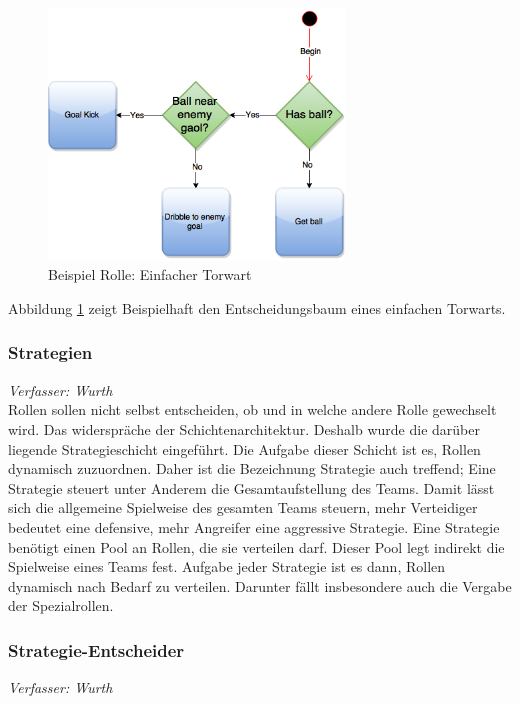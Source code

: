 \documentclass[fontsize=12pt,a4paper,final]{scrartcl}[2003/01/01]
\begin{document}
\begin{figure}[H]
	\centering
	\includegraphics[width=0.7\textwidth]{Grafiken/KI/simple_Player}
	\caption{Beispiel Rolle: Einfacher Torwart}
	\label{Simple keeper}
\end{figure}

Abbildung \ref{Simple keeper} zeigt Beispielhaft den Entscheidungsbaum eines einfachen Torwarts.

\subsubsection{Strategien}
\label{StrategienLabel}
\textit{Verfasser: Wurth}\\

Rollen sollen nicht selbst entscheiden, ob und in welche andere Rolle gewechselt wird. Das widerspräche der Schichtenarchitektur. Deshalb wurde die darüber liegende Strategieschicht eingeführt. Die Aufgabe dieser Schicht ist es, Rollen dynamisch zuzuordnen. Daher ist die Bezeichnung \glqq Strategie\grqq{} auch treffend; Eine Strategie steuert unter Anderem die Gesamtaufstellung des Teams. Damit lässt sich die allgemeine Spielweise des gesamten Teams steuern, mehr Verteidiger bedeutet eine defensive, mehr Angreifer eine aggressive Strategie. Eine Strategie benötigt einen Pool an Rollen, die sie \glqq verteilen\grqq{} darf. Dieser Pool legt indirekt die Spielweise eines Teams fest. Aufgabe jeder Strategie ist es dann, Rollen dynamisch nach Bedarf zu verteilen. Darunter fällt insbesondere auch die Vergabe der Spezialrollen.

\subsubsection{Strategie-Entscheider}
\label{StrategieEntscheiderLabel}
\textit{Verfasser: Wurth}\\
\end{document}

